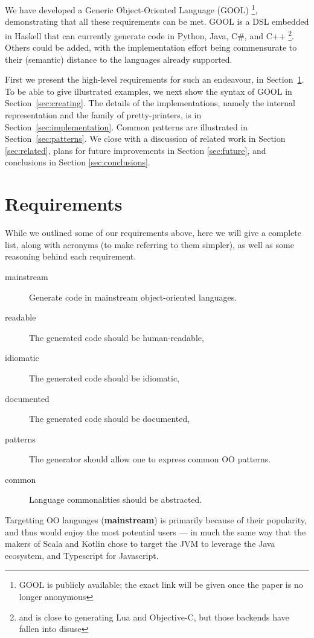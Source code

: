 \documentclass[sigplan,review,anonymous,prologue,dvipsnames]{acmart}
\newcommand{\abbrev}[1]{\textbf{#1}}
\newcommand{\mainstream}{\abbrev{mainstream}}
\begin{document}
We have developed a Generic Object-Oriented Language (GOOL)%
\footnote{GOOL is publicly available; the exact link will be
given once the paper is no longer anonymous}, demonstrating
that all these requirements can be met.  GOOL is a DSL embedded in Haskell that
can currently generate code in Python, Java, C\#, and C++%
\footnote{and is close to generating Lua and Objective-C, but those backends
have fallen into disuse}. Others could be added, with the implementation
effort being commensurate to their (semantic) distance to the languages
already supported.

First we present the high-level requirements for such an endeavour, in
Section~\ref{sec:req}.  To be able to give illustrated examples, we
next show the syntax of GOOL in Section~\ref{sec:creating}. The details of
the implementations, namely the internal representation and the
family of pretty-printers, is in Section~\ref{sec:implementation}.
Common patterns are illustrated in Section~\ref{sec:patterns}.  We 
close with a discussion of related work in Section \ref{sec:related}, plans for 
future improvements in Section \ref{sec:future}, and conclusions in Section 
\ref{sec:conclusions}.

\section{Requirements} \label{sec:req}

While we outlined some of our requirements above, here we will give a 
complete list, along with acronyms (to make referring to them simpler),
as well as some reasoning behind each requirement.

\begin{description}
\item[mainstream] Generate code in mainstream object-oriented languages.
\item[readable] The generated code should be human-readable,
\item[idiomatic] The generated code should be idiomatic,
\item[documented] The generated code should be documented,
\item[patterns] The generator should allow one to express common OO patterns.
\item[common] Language commonalities should be abstracted.
\end{description}

Targetting OO languages (\mainstream) is primarily because of their popularity, and thus
would enjoy the most potential users --- in much the same way that the makers
of Scala and Kotlin chose to target the JVM to leverage the Java ecosystem, and
Typescript for Javascript.
\end{document}
